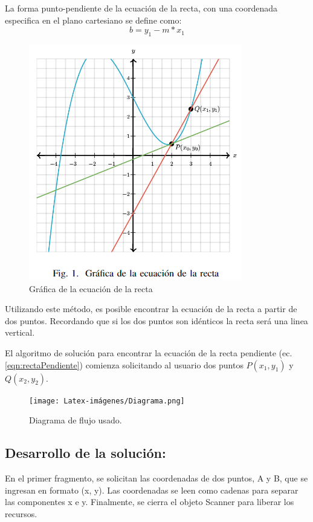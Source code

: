 La forma punto-pendiente de la ecuación de la recta, con una coordenada especifica en el plano cartesiano se define como:
\begin{equation}
    b = y_{1} - m * x_{1}
     \label{eqn:eqnRecta}

\end{equation}
\begin{figure}[H]
    \centering
    \includegraphics[width = 6 cm]{Latex-imágenes/GraficaEcuación.png}
    \caption{Gráfica de la ecuación de la recta}
    \label{fig:GraficaEcuacionRecta}
\end{figure}

Utilizando este método, es posible encontrar la ecuación de la recta a partir de dos puntos. Recordando que si los dos puntos son idénticos la recta será una linea vertical.

El algoritmo de solución para encontrar la ecuación de la recta pendiente  (ec. \ref{eqn:rectaPendiente}) comienza solicitando al usuario dos puntos $P(x_{1}, y_{1})$ y $Q(x_{2}, y_{2})$.\\

\centering
\begin{figure}[H]
    \centering
    \texttt{[image: Latex-imágenes/Diagrama.png]}
    \caption{Diagrama de flujo usado.}
\end{figure}


\subsection{\textbf{Desarrollo de la solución:}}
En el primer fragmento, se solicitan las coordenadas de dos puntos, A y B, que se ingresan en formato (x, y). Las coordenadas se leen como cadenas para separar las componentes x e y. Finalmente, se cierra el objeto Scanner para liberar los recursos.

